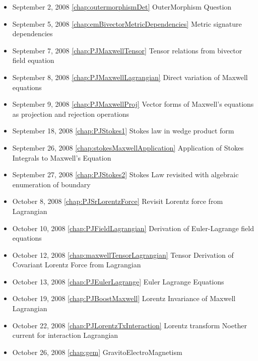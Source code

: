 \begin{itemize}
\item September 2, 2008 \ref{chap:outermorphismDet} OuterMorphism Question 

\item September 5, 2008 \ref{chap:emBivectorMetricDependencies} Metric signature dependencies

\item September 7, 2008 \ref{chap:PJMaxwellTensor} Tensor relations from bivector field equation

\item September 8, 2008 \ref{chap:PJMaxwellLagrangian} Direct variation of Maxwell equations

\item September 9, 2008 \ref{chap:PJMaxwellProj} Vector forms of Maxwell's equations as projection and rejection operations

\item September 18, 2008 \ref{chap:PJStokes1} Stokes law in wedge product form

\item September 26, 2008 \ref{chap:stokesMaxwellApplication} Application of Stokes Integrals to Maxwell's Equation

\item September 27, 2008 \ref{chap:PJStokes2} Stokes Law revisited with algebraic enumeration of boundary

\item October 8, 2008 \ref{chap:PJSrLorentzForce} Revisit Lorentz force from Lagrangian

\item October 10, 2008 \ref{chap:PJFieldLagrangian} Derivation of Euler-Lagrange field equations

\item October 12, 2008 \ref{chap:maxwellTensorLagrangian} Tensor Derivation of Covariant Lorentz Force from Lagrangian

\item October 13, 2008 \ref{chap:PJEulerLagrange} Euler Lagrange Equations

\item October 19, 2008 \ref{chap:PJBoostMaxwell} Lorentz Invariance of Maxwell Lagrangian

\item October 22, 2008 \ref{chap:PJLorentzTxInteraction} Lorentz transform Noether current for interaction Lagrangian

\item October 26, 2008 \ref{chap:gem} GravitoElectroMagnetism


\end{itemize}
